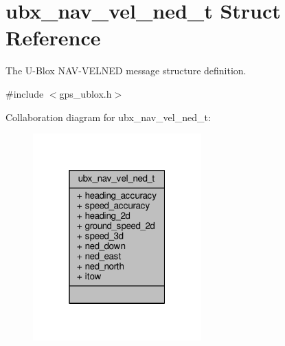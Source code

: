 \hypertarget{structubx__nav__vel__ned__t}{\section{ubx\+\_\+nav\+\_\+vel\+\_\+ned\+\_\+t Struct Reference}
\label{structubx__nav__vel__ned__t}
}


The U-\/\+Blox N\+A\+V-\/\+V\+E\+L\+N\+E\+D message structure definition.  




{\ttfamily \#include $<$gps\+\_\+ublox.\+h$>$}



Collaboration diagram for ubx\+\_\+nav\+\_\+vel\+\_\+ned\+\_\+t\+:
\nopagebreak
\begin{figure}[H]
\begin{center}
\leavevmode
\includegraphics[width=184pt]{structubx__nav__vel__ned__t__coll__graph}
\end{center}
\end{figure}
